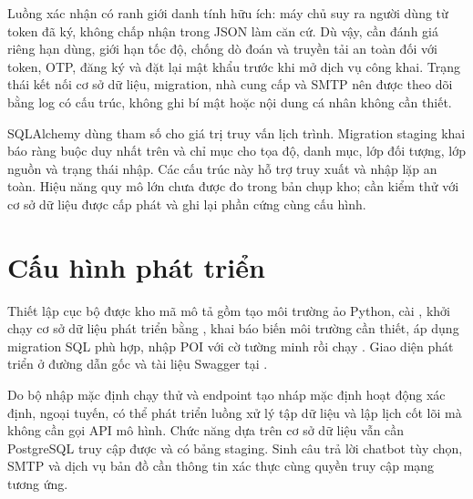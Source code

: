 Luồng xác nhận có ranh giới danh tính hữu ích: máy chủ suy ra người dùng từ token đã ký, không chấp nhận  trong JSON làm căn cứ. Dù vậy, cần đánh giá riêng hạn dùng, giới hạn tốc độ, chống dò đoán và truyền tải an toàn đối với token, OTP, đăng ký và đặt lại mật khẩu trước khi mở dịch vụ công khai. Trạng thái kết nối cơ sở dữ liệu, migration, nhà cung cấp và SMTP nên được theo dõi bằng log có cấu trúc, không ghi bí mật hoặc nội dung cá nhân không cần thiết.

SQLAlchemy dùng tham số cho giá trị truy vấn lịch trình. Migration staging khai báo ràng buộc duy nhất trên  và chỉ mục cho tọa độ, danh mục, lớp đối tượng, lớp nguồn và trạng thái nhập. Các cấu trúc này hỗ trợ truy xuất và nhập lặp an toàn. Hiệu năng quy mô lớn chưa được đo trong bản chụp kho; cần kiểm thử với cơ sở dữ liệu được cấp phát và ghi lại phần cứng cùng cấu hình.

\section{Cấu hình phát triển}

Thiết lập cục bộ được kho mã mô tả gồm tạo môi trường ảo Python, cài , khởi chạy cơ sở dữ liệu phát triển bằng , khai báo biến môi trường cần thiết, áp dụng migration SQL phù hợp, nhập POI với cờ  tường minh rồi chạy . Giao diện phát triển ở đường dẫn gốc và tài liệu Swagger tại .

Do bộ nhập mặc định chạy thử và endpoint tạo nháp mặc định hoạt động xác định, ngoại tuyến, có thể phát triển luồng xử lý tập dữ liệu và lập lịch cốt lõi mà không cần gọi API mô hình. Chức năng dựa trên cơ sở dữ liệu vẫn cần PostgreSQL truy cập được và có bảng staging. Sinh câu trả lời chatbot tùy chọn, SMTP và dịch vụ bản đồ cần thông tin xác thực cùng quyền truy cập mạng tương ứng.
